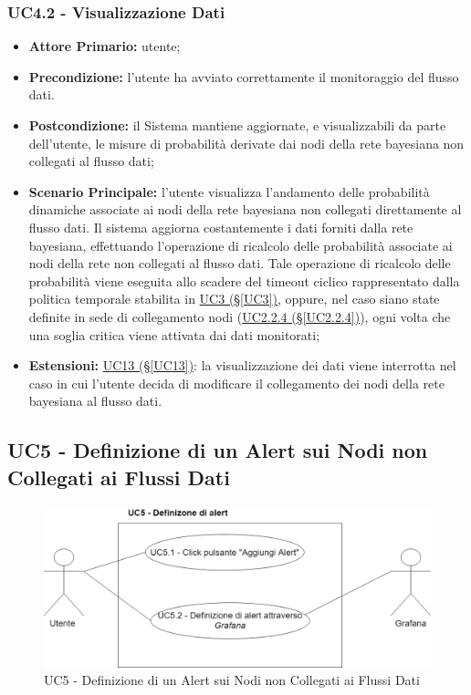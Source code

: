\subsubsection{UC4.2 - Visualizzazione Dati}\label{UC4.2}
\begin{itemize}
\item \textbf{Attore Primario:} utente;
\item \textbf{Precondizione:} l'utente ha avviato correttamente il monitoraggio del flusso dati.
\item \textbf{Postcondizione:} il Sistema mantiene aggiornate, e visualizzabili da parte dell'utente, le misure di probabilità derivate dai nodi della rete bayesiana non collegati al flusso dati;
\item \textbf{Scenario Principale:} l'utente visualizza l'andamento delle probabilità dinamiche associate ai nodi 			della rete bayesiana non collegati direttamente al flusso dati. Il sistema aggiorna costantemente i dati forniti dalla rete bayesiana, effettuando l'operazione di ricalcolo delle probabilità associate ai nodi della rete non collegati al flusso dati. Tale operazione di ricalcolo delle probabilità viene eseguita allo scadere del timeout ciclico rappresentato dalla politica temporale stabilita in \hyperref[UC3]{UC3 (§\ref*{UC3})}, oppure, nel caso siano state definite in sede di collegamento nodi (\hyperref[UC2.2.4]{UC2.2.4 (§\ref*{UC2.2.4})}), ogni volta che una soglia critica viene attivata dai dati monitorati;
\item \textbf{Estensioni:} \hyperref[UC13]{UC13 (§\ref*{UC13})}: la visualizzazione dei dati viene interrotta nel 			caso in cui l'utente decida di modificare il collegamento dei nodi della rete bayesiana al flusso dati.
\end{itemize}

\newpage

\subsection{UC5 - Definizione di un Alert sui Nodi non Collegati ai Flussi Dati}\label{UC5}

\begin{figure}[H]
	\centering
	\includegraphics[scale=0.3]{./images/UC5.png}
	\caption{UC5 - Definizione di un Alert sui Nodi non Collegati ai Flussi Dati}
\end{figure}

